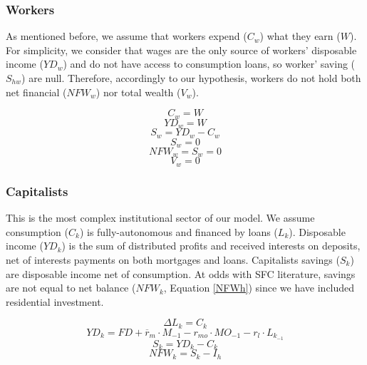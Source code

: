 \documentclass[12pt, a4]{article}
\begin{document}
\subsubsection{Workers}
\label{sec:org57204a2}

As mentioned before, we assume that workers expend (\(C_w\)) what they earn (\(W\)). 
For simplicity, we consider that wages are the only source of workers' disposable income (\(YD_{w}\)) and do not have access to consumption loans, so worker' saving (\(S_{hw}\)) are null.
Therefore, accordingly to our hypothesis, workers do not hold both net financial (\(NFW_{w}\)) nor total wealth (\(V_{w}\)).

\begin{equation}
C_w = W
\end{equation}
\begin{equation}
YD_w = W
\end{equation}
\begin{equation}
S_{w} = YD_w - C_w
\end{equation}
$$
S_{w} = 0
$$
\begin{equation}
NFW_{w} = S_{w} = 0
\end{equation}
\begin{equation}
V_{w} = 0
\end{equation}

\subsubsection{Capitalists}
\label{sec:org21dfeb2}

This is the most complex institutional sector of our model. 
We assume consumption (\(C_k\)) is fully-autonomous and financed by loans (\(L_{k}\)). 
Disposable income (\(YD_k\)) is the sum of distributed profits and received interests on deposits, net of interests payments
on both mortgages and loans.
Capitalists savings (\(S_{k}\)) are disposable income net of consumption.
At odds with SFC literature, savings are not equal to net balance (\(NFW_{k}\), Equation \ref{NFWh}) since we have included residential investment.

\begin{equation}
\Delta L_{k} = C_k
\end{equation}
\begin{equation}
    \label{EqYD}
    YD_k = FD + \overline r_m\cdot M_{-1} - r_{mo}\cdot MO_{-1} - r_{l}\cdot L_{k_{-1}}
\end{equation}
\begin{equation}
    \label{EqSh}
    S_{k} = YD_k - C_k
\end{equation}
\begin{equation}
\label{NFWh}
    NFW_{k} = S_{k} - I_h
\end{equation}
\end{document}
